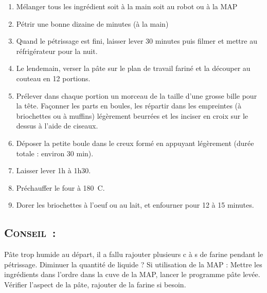 \begin{enumerate}
\item Mélanger tous les ingrédient soit à la main soit au robot ou à la MAP
\item Pétrir une bonne dizaine de minutes (à la main)
\item Quand le p\'etrissage est fini, laisser lever 30 minutes puis filmer et mettre au r\'efrig\'erateur pour la nuit.
\item Le lendemain, verser la p\^ate sur le plan de travail farin\'e et la d\'ecouper au couteau en 12 portions. 
\item Pr\'elever dans chaque portion un morceau de la taille d'une grosse bille pour la t\^ete. Façonner les parts en boules, les r\'epartir dans les empreintes (\`a briochettes ou \`a muffins) l\'eg\`erement beurr\'ees et les inciser en croix sur le dessus \`a l'aide de ciseaux. \item D\'eposer la petite boule dans le creux form\'e en appuyant l\'eg\`erement (dur\'ee totale : environ 30 min). 
\item Laisser lever 1h \`a 1h30.
\item Pr\'echauffer le four \`a 180\ C. 
\item Dorer les briochettes \`a l'oeuf ou au lait, et enfourner pour 12 \`a 15 minutes.

\end{enumerate}
\subsection*{\textsc{Conseil~:}}
P\^ate trop humide au d\'epart, il a fallu rajouter plusieurs c \`a s de farine pendant le p\'etrissage. Diminuer la quantit\'e de liquide ?
Si utilisation de la MAP : Mettre les ingr\'edients dans l'ordre dans la cuve de la MAP, lancer le programme p\^ate lev\'ee. V\'erifier l'aspect de la p\^ate, rajouter de la farine si besoin. 